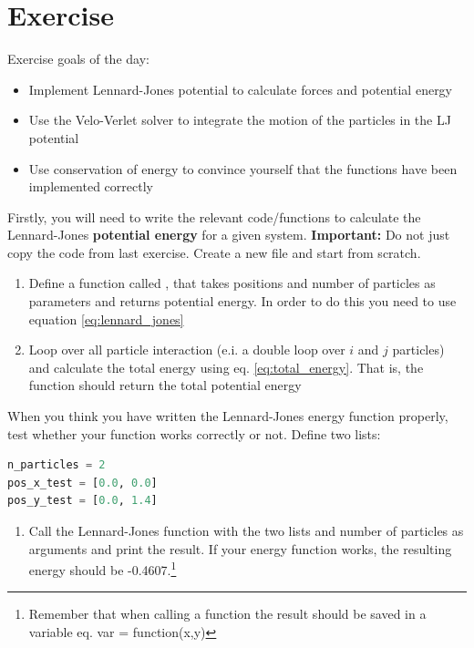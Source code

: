 \documentclass{article}
\begin{document}
\newpage
\clearpage
\section{Exercise}

Exercise goals of the day:
\begin{itemize}
    \item Implement Lennard-Jones potential to calculate forces and potential energy
    \item Use the Velo-Verlet solver to integrate the motion of the particles in the LJ potential
    \item Use conservation of energy to convince yourself that the functions have been implemented correctly
\end{itemize}

Firstly, you will need to write the relevant code/functions to calculate the Lennard-Jones {\bf potential energy} for a given system.
{\bf Important:} Do not just copy the code from last exercise. Create a new file and start from scratch.

\begin{enumerate}

    \item Define a function called , that takes positions and number of particles as parameters and returns potential energy. In order to do this you need to use equation \ref{eq:lennard_jones}

    \item Loop over all particle interaction (e.i. a double loop over $i$ and $j$ particles) and calculate the total energy using eq. \ref{eq:total_energy}. That is, the function  should return the total potential energy

\end{enumerate}

When you think you have written the Lennard-Jones energy function properly, test whether your function works correctly or not.
Define two lists:

\begin{lstlisting}[language=python]
n_particles = 2
pos_x_test = [0.0, 0.0]
pos_y_test = [0.0, 1.4]
\end{lstlisting}

\begin{enumerate}[resume]

    \item Call the Lennard-Jones function with the two lists and number of particles as arguments and print the result.
        If your energy function works, the resulting energy should be -0.4607.\footnote{Remember that when calling a function the result should be saved in a variable eq. var = function(x,y)}

\end{enumerate}
\end{document}

